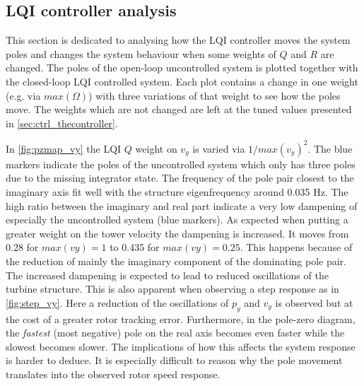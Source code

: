 \subsection{LQI controller analysis}
This section is dedicated to analysing how the LQI controller moves the system poles and changes the system behaviour when some weights of $ Q $ and $ R $ are changed. The poles of the open-loop uncontrolled system is plotted together with the closed-loop LQI controlled system. Each plot contains a change in one weight (e.g. via $ max(\Omega) $) with three variations of that weight to see how the poles move. The weights which are not changed are left at the tuned values presented in \cref{sec:ctrl_thecontroller}. 

\smallskip
In \cref{fig:pzmap_vy} the LQI $ Q $ weight on $ v_y $ is varied via $ 1/max(v_y)^2 $. The blue markers indicate the poles of the uncontrolled system which only has three poles due to the missing integrator state. The frequency of the pole pair closest to the imaginary axis fit well with the structure eigenfrequency around 0.035 Hz. The high ratio between the imaginary and real part indicate a very low dampening of especially the uncontrolled system (blue markers). As expected when putting a greater weight on the tower velocity the dampening is increased. It moves from 0.28 for $ max(vy) = 1 $ to 0.435 for $ max(vy) = 0.25 $. This happens because of the reduction of mainly the imaginary component of the dominating pole pair. The increased dampening is expected to lead to reduced oscillations of the turbine structure. This is also apparent when observing a step response as in \cref{fig:step_vy}. Here a reduction of the oscillations of $ p_y $ and $ v_y $ is observed but at the cost of a greater rotor tracking error. Furthermore, in the pole-zero diagram, the \textit{fastest} (most negative) pole on the real axis becomes even faster while the slowest becomes slower. The implications of how this affects the system response is harder to deduce. It is especially difficult to reason why the pole movement translates into the observed rotor speed response.

